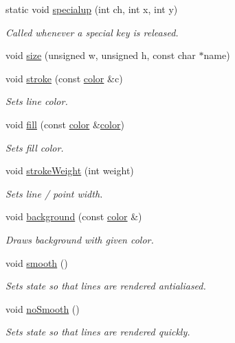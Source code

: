 \begin{DoxyCompactItemize}
static void \hyperlink{namespacecprocessing_af02bc302506ac700a3a297172dcb15d6}{specialup} (int ch, int x, int y)
\begin{DoxyCompactList}\small\item\em \-Called whenever a special key is released. \end{DoxyCompactList}\item 
void \hyperlink{namespacecprocessing_a4bbf578baacdd32fea5fab20517028ce}{size} (unsigned w, unsigned h, const char $\ast$name)
\item 
void \hyperlink{namespacecprocessing_af815879b404059ab470b9c33355d084f}{stroke} (const \hyperlink{classcprocessing_1_1color}{color} \&c)
\begin{DoxyCompactList}\small\item\em \-Sets line color. \end{DoxyCompactList}\item 
void \hyperlink{namespacecprocessing_a0cdae921f6061ef2e6574ba2d3a08fe3}{fill} (const \hyperlink{classcprocessing_1_1color}{color} \&\hyperlink{classcprocessing_1_1color}{color})
\begin{DoxyCompactList}\small\item\em \-Sets fill color. \end{DoxyCompactList}\item 
void \hyperlink{namespacecprocessing_a80f508e91c571079b7632c808246e85f}{stroke\-Weight} (int weight)
\begin{DoxyCompactList}\small\item\em \-Sets line / point width. \end{DoxyCompactList}\item 
void \hyperlink{namespacecprocessing_ac8cb10897d638434fd395afe0da61e7e}{background} (const \hyperlink{classcprocessing_1_1color}{color} \&)
\begin{DoxyCompactList}\small\item\em \-Draws background with given color. \end{DoxyCompactList}\item 
void \hyperlink{namespacecprocessing_a3078c9359807ad49550d1d0961827f3d}{smooth} ()
\begin{DoxyCompactList}\small\item\em \-Sets state so that lines are rendered antialiased. \end{DoxyCompactList}\item 
void \hyperlink{namespacecprocessing_a1e2a2adb15840df8dd16c8996863a905}{no\-Smooth} ()
\begin{DoxyCompactList}\small\item\em \-Sets state so that lines are rendered quickly. \end{DoxyCompactList}\item 

\end{DoxyCompactItemize}
